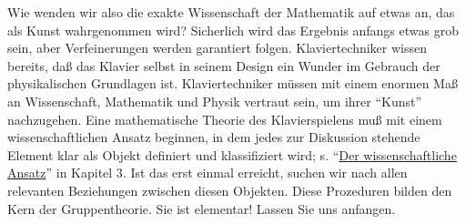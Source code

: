 Wie wenden wir also die exakte Wissenschaft der Mathematik auf etwas an, das als Kunst wahrgenommen wird?
Sicherlich wird das Ergebnis anfangs etwas grob sein, aber Verfeinerungen werden garantiert folgen.
Klaviertechniker wissen bereits, daß das Klavier selbst in seinem Design ein Wunder im Gebrauch der physikalischen Grundlagen ist.
Klaviertechniker müssen mit einem enormen Maß an Wissenschaft, Mathematik und Physik vertraut sein, um ihrer \enquote{Kunst} nachzugehen.
Eine mathematische Theorie des Klavierspielens muß mit einem wissenschaftlichen Ansatz beginnen, in dem jedes zur Diskussion stehende Element klar als Objekt definiert und klassifiziert wird; s. \enquote{\hyperref[c3_2]{Der wissenschaftliche Ansatz}} in Kapitel 3.
Ist das erst einmal erreicht, suchen wir nach allen relevanten Beziehungen zwischen diesen Objekten.
Diese Prozeduren bilden den Kern der Gruppentheorie. Sie ist elementar! Lassen Sie uns anfangen.



